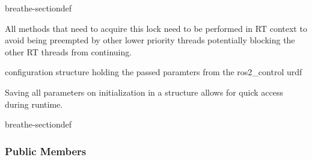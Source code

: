\documentclass[letterpaper,10pt,english]{sphinxmanual}
\begin{document}
\begin{fulllineitems}
\begin{sphinxuseclass}{breathe-sectiondef}
\begin{fulllineitems}
\begin{itemize}
\end{itemize}


\sphinxAtStartPar
All methods that need to acquire this lock need to be performed in RT context to avoid being preempted by other lower priority threads potentially blocking the other RT threads from continuing. 

\end{fulllineitems}


\end{sphinxuseclass}

\begin{fulllineitems}
\label{\detokenize{code/bioscara_hardware_interfaces/index:_CPPv4N28bioscara_hardware_interfaces28bioscara_hardware_interfaces28BioscaraArmHardwareInterface14joint_config_tE}}\label{\detokenize{code/bioscara_hardware_interfaces/index:_CPPv3N28bioscara_hardware_interfaces28bioscara_hardware_interfaces28BioscaraArmHardwareInterface14joint_config_tE}}\label{\detokenize{code/bioscara_hardware_interfaces/index:_CPPv2N28bioscara_hardware_interfaces28bioscara_hardware_interfaces28BioscaraArmHardwareInterface14joint_config_tE}}\label{\detokenize{code/bioscara_hardware_interfaces/index:bioscara_hardware_interfaces::bioscara_hardware_interfaces::BioscaraArmHardwareInterface::joint_config_t}}
\pysigstartsignatures
\pysigstartmultiline
\pysigline
{\label{\detokenize{code/bioscara_hardware_interfaces/index:structbioscara__hardware__interfaces_1_1BioscaraArmHardwareInterface_1_1joint__config__t}}}
\pysigstopmultiline
\pysigstopsignatures
\sphinxAtStartPar
configuration structure holding the passed paramters from the ros2\_control urdf 

\sphinxAtStartPar
Saving all parameters on initialization in a structure allows for quick access during runtime. 

\begin{sphinxuseclass}{breathe-sectiondef}\subsubsection*{Public Members}


\end{sphinxuseclass}
\end{fulllineitems}
\end{fulllineitems}
\end{document}

